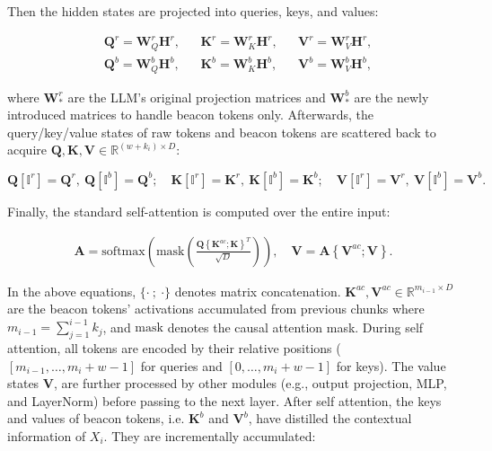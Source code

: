 Then the hidden states are projected into queries, keys, and values:

\begin{align}
    &\boldsymbol{Q}^{r}=\boldsymbol{W}_Q^{r}\boldsymbol{H}^{r},&
    &\boldsymbol{K}^{r}=\boldsymbol{W}_K^{r}\boldsymbol{H}^{r},&
    &\boldsymbol{V}^{r}=\boldsymbol{W}_V^{r}\boldsymbol{H}^{r},\nonumber\\
    &\boldsymbol{Q}^{b}=\boldsymbol{W}^{b}_Q\boldsymbol{H}^{b},&
    &\boldsymbol{K}^{b}=\boldsymbol{W}^{b}_K\boldsymbol{H}^{b},&
    &\boldsymbol{V}^{b}=\boldsymbol{W}^{b}_V\boldsymbol{H}^{b},
    \label{eq:projection}
\end{align}

where $\boldsymbol{W}_*^{r}$ are the LLM's original projection matrices and $\boldsymbol{W}_*^{b}$ are the newly introduced matrices to handle beacon tokens only. Afterwards, the query/key/value states of raw tokens and beacon tokens are scattered back to acquire $\boldsymbol{Q}, \boldsymbol{K}, \boldsymbol{V}\in\mathbb{R}^{(w+k_i)\times D}$:

\begin{equation}
    \boldsymbol{Q}[\mathbb{I}^r]=\boldsymbol{Q}^r,~\boldsymbol{Q}[\mathbb{I}^b]=\boldsymbol{Q}^b;\quad \boldsymbol{K}[\mathbb{I}^r]=\boldsymbol{K}^r,~\boldsymbol{K}[\mathbb{I}^b]=\boldsymbol{K}^b;\quad \boldsymbol{V}[\mathbb{I}^r]=\boldsymbol{V}^r,~\boldsymbol{V}[\mathbb{I}^b]=\boldsymbol{V}^b.
    \label{eq:scatter}
\end{equation}

Finally, the standard self-attention is computed over the entire input:

\begin{gather}
    \boldsymbol{A}= \mathrm{softmax}\left(\mathrm{mask}\left(\frac{\boldsymbol{Q}\left\{\boldsymbol{K}^{ac};\boldsymbol{K}\right\}^T}{\sqrt{D}}\right)\right),\quad\boldsymbol{V}=\boldsymbol{A}\left\{\boldsymbol{V}^{ac};\boldsymbol{V}\right\}.
    \label{eq:self-attention}
\end{gather}

In the above equations, $\{\cdot~;~\cdot\}$ denotes matrix concatenation. $\boldsymbol{K}^{ac}, \boldsymbol{V}^{ac}\in\mathbb{R}^{m_{i-1} \times D}$ are the beacon tokens' activations accumulated from previous chunks where $m_{i-1}=\sum_{j=1}^{i-1}{k_j}$, and $\mathrm{mask}$ denotes the causal attention mask. During self attention, all tokens are encoded by their relative positions ($[m_{i-1}, \dots, m_{i} + w - 1]$ for queries and $[0, \dots ,m_{i} + w - 1]$ for keys). The value states $\boldsymbol{V}$, are further processed by other modules (e.g., output projection, MLP, and LayerNorm) before passing to the next layer. After self attention, the keys and values of beacon tokens, i.e. $\boldsymbol{K}^b$ and $\boldsymbol{V}^b$, have distilled the contextual information of $X_i$. They are incrementally accumulated:

